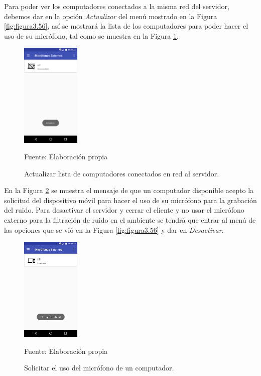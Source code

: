 Para poder ver los computadores conectados a la misma red del servidor, debemos dar en la opción \textit{Actualizar} del menú mostrado en la Figura \ref{fig:figura3.56}, así se mostrará la lista de los computadores para poder hacer el uso de su micrófono, tal como se muestra en la Figura \ref{fig:figura3.58}.
\begin{figure}[H]
\captionsetup{justification=centering}
\begin{center}
\includegraphics[width=0.25\textwidth]{Imagenes/Cap3/image058}
\end{center}
\begin{center}
\vskip -0.5cm
\caption{\small{Actualizar lista de computadores conectados en red al servidor.}}
\label{fig:figura3.58}
{\small{Fuente: Elaboración propia}}
\end{center}
\end{figure}

En la Figura \ref{fig:figura3.59} se muestra el mensaje de que un computador disponible acepto la solicitud del dispositivo móvil para hacer el uso de su micrófono para la grabación del ruido. Para desactivar el servidor y cerrar el cliente y no usar el micrófono externo para la filtración de ruido en el ambiente se tendrá que entrar al menú de las opciones que se vió en la Figura \ref{fig:figura3.56} y dar en \textit{Desactivar}.
\begin{figure}[H]
\captionsetup{justification=centering}
\begin{center}
\includegraphics[width=0.25\textwidth]{Imagenes/Cap3/image059}
\end{center}
\begin{center}
\vskip -0.5cm
\caption{\small{Solicitar el uso del micrófono de un computador.}}
\label{fig:figura3.59}
{\small{Fuente: Elaboración propia}}
\end{center}
\end{figure}

